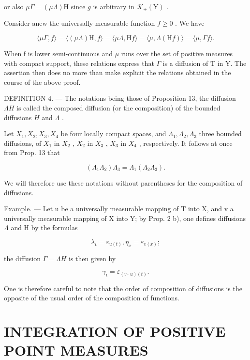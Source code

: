 or also \(\mu \Gamma = (\mu \Lambda)\mathrm{H}\) since \(g\) is arbitrary in \(\mathcal{K}_+(\mathrm{Y})\) .

Consider anew the universally measurable function \(f \geqslant 0\) . We have

\[
\langle \mu \Gamma , f \rangle = \langle (\mu \Lambda) \mathrm{H}, f \rangle = \langle \mu \Lambda , \mathrm{H} f \rangle = \langle \mu , \Lambda (\mathrm{H} f) \rangle = \langle \mu , \Gamma f \rangle .
\]

When f is lower semi-continuous and \(\mu\) runs over the set of positive measures with compact support, these relations express that \(\Gamma\) is a diffusion of T in Y. The assertion then does no more than make explicit the relations obtained in the course of the above proof.

DEFINITION 4. --- The notations being those of Proposition 13, the diffusion \(\Lambda H\) is called the composed diffusion (or the composition) of the bounded diffusions \(H\) and \(\Lambda\) .

Let \(X_{1}, X_{2}, X_{3}, X_{4}\) be four locally compact spaces, and \(\Lambda_{1}, \Lambda_{2}, \Lambda_{3}\) three bounded diffusions, of \(X_{1}\) in \(X_{2}\) , \(X_{2}\) in \(X_{3}\) , \(X_{3}\) in \(X_{4}\) , respectively. It follows at once from Prop. 13 that

\[
(\Lambda_ {1} \Lambda_ {2}) \Lambda_ {3} = \Lambda_ {1} (\Lambda_ {2} \Lambda_ {3}).
\]

We will therefore use these notations without parentheses for the composition of diffusions.

Example. --- Let u be a universally measurable mapping of T into X, and v a universally measurable mapping of X into Y; by Prop. 2 b), one defines diffusions \(\Lambda\) and H by the formulas

\[
\lambda_ {t} = \varepsilon_ {u (t)}, \eta_ {x} = \varepsilon_ {v (x)};
\]

the diffusion \(\Gamma = \Lambda H\) is then given by

\[
\gamma_ {t} = \varepsilon_ {(v \circ u) (t)}.
\]

One is therefore careful to note that the order of composition of diffusions is the opposite of the usual order of the composition of functions.

\section{INTEGRATION OF POSITIVE POINT MEASURES}

